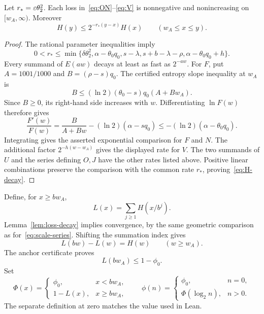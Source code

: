 \begin{lemma}\label{lem:loss-decay}
Let $r_* =\varepsilon\theta_2^2$. Each loss in~\eqref{eq:ON}--\eqref{eq:V} is
nonnegative and nonincreasing on $[w_A,\infty)$. Moreover
\begin{equation}\label{eq:H-decay}
 H(y)\le 2^{-r_*(y-x)}H(x)\qquad(w_A\le x\le y).
\end{equation}
\end{lemma}
\begin{proof}
The rational parameter inequalities imply
\[
 0<r_*\le\min\{\delta\theta_2^2,\alpha-\theta_0q_0,
 s-\lambda,s+b-\lambda-\rho,\alpha-\theta_0q_0+h\}.
\]
Every summand of $E(aw)$ decays at least as fast as $2^{-aw}$.
For $F$, put $A=1001/1000$ and $B=(\rho-s)q_0$. The certified entropy
slope inequality at $w_A$ is
\[
 B\le (\ln2)(\theta_0-s)q_0(A+Bw_A).
\]
Since $B\ge0$, its right-hand side increases with $w$. Differentiating
$\ln F(w)$ therefore gives
\[
 \frac{F'(w)}{F(w)}=\frac B{A+Bw}-(\ln2)(\alpha-sq_0)
       \le-(\ln2)(\alpha-\theta_0q_0).
\]
Integrating gives the asserted exponential comparison for $F$ and $N$.
The additional factor $2^{-h(w-w_A)}$ gives the displayed rate for $V$.
The two summands of $U$ and the series defining $O,J$ have the other rates
listed above. Positive linear combinations preserve the comparison with
the common rate $r_*$, proving~\eqref{eq:H-decay}.
\end{proof}

Define, for $x\ge bw_A$,
\begin{equation}\label{eq:renewal-loss}
 L(x)=\sum_{j\ge1}H(x/b^j).
\end{equation}
Lemma~\ref{lem:loss-decay} implies convergence, by the same geometric
comparison as for~\eqref{eq:scale-series}. Shifting the summation index gives
\begin{equation}\label{eq:renewal-identity}
                         L(bw)-L(w)=H(w)\qquad(w\ge w_A).
\end{equation}
The anchor certificate proves
\begin{equation}\label{eq:anchor-floor}
                         L(bw_A)\le1-\phi_0.
\end{equation}
Set
\begin{equation}\label{eq:Phi}
 \Phi(x)=\begin{cases}\phi_0,&x<bw_A,\\1-L(x),&x\ge bw_A,\end{cases}
 \qquad
 \phi(n)=\begin{cases}\phi_0,&n=0,\\\Phi(\log_2n),&n>0.\end{cases}
\end{equation}
The separate definition at zero matches the value used in Lean.


